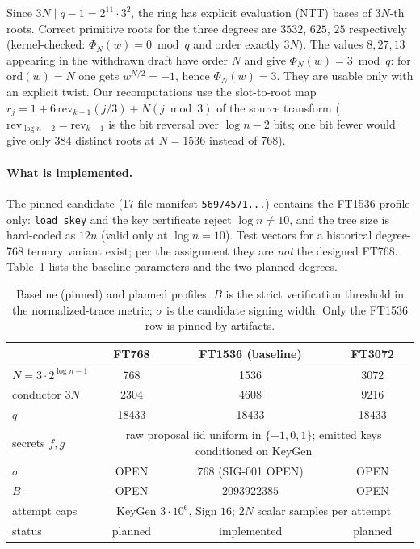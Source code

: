 \documentclass[11pt,a4paper]{article}
\theoremstyle{remark}
\newcommand{\OPEN}{\textsf{OPEN}}
\begin{document}
Since $3N\mid q-1=2^{11}\cdot 3^2$, the ring has explicit evaluation (NTT)
bases of $3N$-th roots. Correct primitive roots for the three degrees are
$3532$, $625$, $25$ respectively (kernel-checked: $\Phi_N(w)=0 \bmod q$ and
order exactly $3N$). The values $8,27,13$ appearing in the withdrawn draft
have order $N$ and give $\Phi_N(w)=3 \bmod q$: for $\mathrm{ord}(w)=N$ one
gets $w^{N/2}=-1$, hence $\Phi_N(w)=3$. They are usable only with an
explicit twist. Our recomputations use the slot-to-root map
$r_j=1+6\,\mathrm{rev}_{k-1}(j/3)+N(j\bmod 3)$ of the source transform
($\mathrm{rev}_{\log n-2}=\mathrm{rev}_{k-1}$ is the bit reversal over
$\log n-2$ bits; one bit fewer would give only 384 distinct roots at
$N=1536$ instead of 768).

\paragraph{What is implemented.} The pinned candidate (17-file manifest
\texttt{56974571...}) contains the FT1536 profile only: \texttt{load\_skey}
and the key certificate reject $\log n\neq 10$, and the tree size is
hard-coded as $12n$ (valid only at $\log n=10$). Test vectors for a
historical degree-768 ternary variant exist; per the assignment they are
\emph{not} the designed FT768. Table~\ref{tab:params} lists the baseline
parameters and the two planned degrees.

\begin{table}[ht]\centering
\caption{Baseline (pinned) and planned profiles. $B$ is the strict
verification threshold in the normalized-trace metric; $\sigma$ is the
candidate signing width. Only the FT1536 row is pinned by artifacts.}
\label{tab:params}
\begin{tabular}{lccc}
\toprule
 & FT768 & FT1536 (baseline) & FT3072 \\
\midrule
$N=3\cdot2^{\log n-1}$ & 768 & 1536 & 3072 \\
conductor $3N$ & 2304 & 4608 & 9216 \\
$q$ & 18433 & 18433 & 18433 \\
secrets $f,g$ & \multicolumn{3}{c}{raw proposal iid uniform in $\{-1,0,1\}$; emitted keys conditioned on KeyGen} \\
$\sigma$ & \OPEN & 768 (SIG-001 \OPEN) & \OPEN \\
$B$ & \OPEN & $2093922385$ & \OPEN \\
attempt caps & \multicolumn{3}{c}{KeyGen $3\cdot 10^6$, Sign $16$; $2N$ scalar samples per attempt} \\
status & planned & implemented & planned \\
\bottomrule
\end{tabular}
\end{table}
\end{document}
